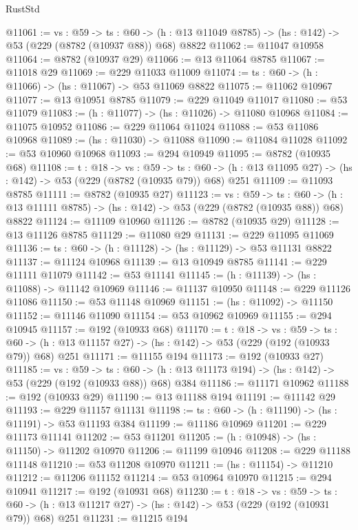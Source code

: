 \begin{lexlean}{RustStd}
\begin{coremodule}
@11061 := {vs : @59} ->
  {ts : @60} -> (h : @13 @11049 @8785) -> (hs : @142) -> @53 (@229 (@8782 (@10937 @88)) @68) @8822
@11062 := @11047 @10958
@11064 := @8782 (@10937 @29)
@11066 := @13 @11064 @8785
@11067 := @11018 @29
@11069 := @229 @11033 @11009
@11074 := {ts : @60} -> (h : @11066) -> (hs : @11067) -> @53 @11069 @8822
@11075 := @11062 @10967
@11077 := @13 @10951 @8785
@11079 := @229 @11049 @11017
@11080 := @53 @11079
@11083 := (h : @11077) -> (hs : @11026) -> @11080 @10968
@11084 := @11075 @10952
@11086 := @229 @11064 @11024
@11088 := @53 @11086 @10968
@11089 := (hs : @11030) -> @11088
@11090 := @11084 @11028
@11092 := @53 @10960 @10968
@11093 := @294 @10949
@11095 := @8782 (@10935 @68)
@11108 := {t : @18} ->
  {vs : @59} ->
  {ts : @60} -> (h : @13 @11095 @27) -> (hs : @142) -> @53 (@229 (@8782 (@10935 @79)) @68) @251
@11109 := @11093 @8785
@11111 := @8782 (@10935 @27)
@11123 := {vs : @59} ->
  {ts : @60} -> (h : @13 @11111 @8785) -> (hs : @142) -> @53 (@229 (@8782 (@10935 @88)) @68) @8822
@11124 := @11109 @10960
@11126 := @8782 (@10935 @29)
@11128 := @13 @11126 @8785
@11129 := @11080 @29
@11131 := @229 @11095 @11069
@11136 := {ts : @60} -> (h : @11128) -> (hs : @11129) -> @53 @11131 @8822
@11137 := @11124 @10968
@11139 := @13 @10949 @8785
@11141 := @229 @11111 @11079
@11142 := @53 @11141
@11145 := (h : @11139) -> (hs : @11088) -> @11142 @10969
@11146 := @11137 @10950
@11148 := @229 @11126 @11086
@11150 := @53 @11148 @10969
@11151 := (hs : @11092) -> @11150
@11152 := @11146 @11090
@11154 := @53 @10962 @10969
@11155 := @294 @10945
@11157 := @192 (@10933 @68)
@11170 := {t : @18} ->
  {vs : @59} ->
  {ts : @60} -> (h : @13 @11157 @27) -> (hs : @142) -> @53 (@229 (@192 (@10933 @79)) @68) @251
@11171 := @11155 @194
@11173 := @192 (@10933 @27)
@11185 := {vs : @59} ->
  {ts : @60} -> (h : @13 @11173 @194) -> (hs : @142) -> @53 (@229 (@192 (@10933 @88)) @68) @384
@11186 := @11171 @10962
@11188 := @192 (@10933 @29)
@11190 := @13 @11188 @194
@11191 := @11142 @29
@11193 := @229 @11157 @11131
@11198 := {ts : @60} -> (h : @11190) -> (hs : @11191) -> @53 @11193 @384
@11199 := @11186 @10969
@11201 := @229 @11173 @11141
@11202 := @53 @11201
@11205 := (h : @10948) -> (hs : @11150) -> @11202 @10970
@11206 := @11199 @10946
@11208 := @229 @11188 @11148
@11210 := @53 @11208 @10970
@11211 := (hs : @11154) -> @11210
@11212 := @11206 @11152
@11214 := @53 @10964 @10970
@11215 := @294 @10941
@11217 := @192 (@10931 @68)
@11230 := {t : @18} ->
  {vs : @59} ->
  {ts : @60} -> (h : @13 @11217 @27) -> (hs : @142) -> @53 (@229 (@192 (@10931 @79)) @68) @251
@11231 := @11215 @194

\end{coremodule}
\end{lexlean}
